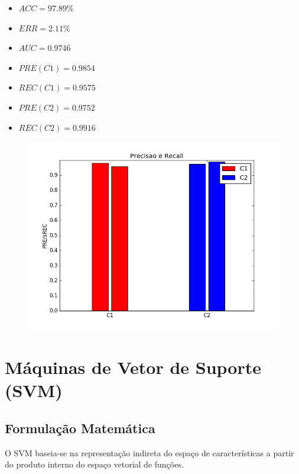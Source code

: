 \documentclass[11pt,a4paper]{article}
\numberwithin{equation}{section}
\begin{document}
\begin{minipage}{.5\textwidth}
\begin{itemize}
\item $ACC = 97.89 \%$
\item $ERR =  2.11 \%$
\item $AUC = 0.9746  $
\item $PRE(C1) = 0.9854$
\item $REC(C1) = 0.9575$
\item $PRE(C2) = 0.9752$
\item $REC(C2) = 0.9916$
\end{itemize}
\end{minipage}%
\begin{minipage}{.5\textwidth}
\begin{figure}[H]
\centering
  \includegraphics[width=\linewidth]{../img/mlp_10x10.png}
  \label{fig:percep}
\end{figure}
\end{minipage}%


\section{Máquinas de Vetor de Suporte (SVM)}
\subsection{Formulação Matemática}
O SVM baseia-se na representação indireta do espaço de características a partir do produto interno do espaço vetorial de funções. 
\end{document}
